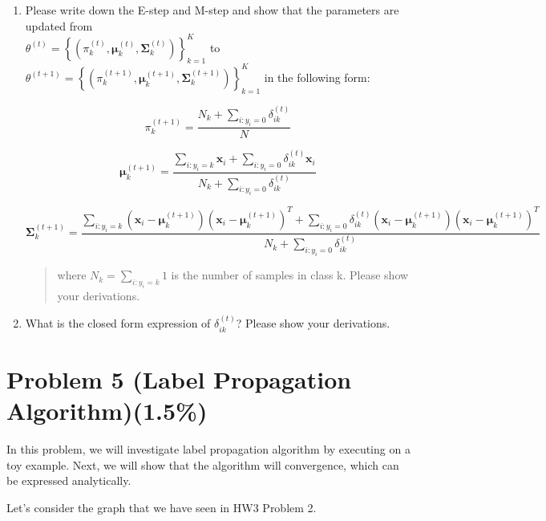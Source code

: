 \documentclass{article}
\def\vecmu{{\boldsymbol \mu}}
\begin{document}
\begin{enumerate}
\item
Please write down the E-step and M-step and show
  that the parameters are updated from \\
  \(\theta^{(t)} = \left\{ \left( \pi_{k}^{(t)},\vecmu_{k}^{(t)},\mathbf{\Sigma}_{k}^{(t)} \right) \right\}_{k = 1}^{K}\)
  to
  \(\theta^{(t + 1)} = \left\{ \left( \pi_{k}^{(t + 1)},\vecmu_{k}^{(t + 1)},\mathbf{\Sigma}_{k}^{(t + 1)} \right) \right\}_{k = 1}^{K}\)
  in the following form:


\[\pi_{k}^{(t + 1)} = \frac{N_{k} + \sum_{i:y_{i} = 0}^{}\delta_{ik}^{(t)}}{N}\]

\[\vecmu_{k}^{(t + 1)} = \frac{\sum_{i:y_{i} = k}^{}\mathbf{x}_{i} + \sum_{i:y_{i} = 0}^{}{\delta_{ik}^{(t)}\mathbf{x}_{i}}}{N_{k} + \sum_{i:y_{i} = 0}^{}\delta_{ik}^{(t)}}\]

\[\mathbf{\Sigma}_{k}^{(t + 1)} = \frac{\sum_{i:y_{i} = k}^{}{\left( \mathbf{x}_{i} - \vecmu_{k}^{(t + 1)} \right)\left( \mathbf{x}_{i} - \vecmu_{k}^{(t + 1)} \right)^{T}} + \sum_{i:y_{i} = 0}^{}{\delta_{ik}^{(t)}\left( \mathbf{x}_{i} - \vecmu_{k}^{(t + 1)} \right)\left( \mathbf{x}_{i} - \vecmu_{k}^{(t + 1)} \right)^{T}}}{N_{k} + \sum_{i:y_{i} = 0}^{}\delta_{ik}^{(t)}}\]

\begin{quote}
where \(N_{k} = \sum_{i:y_{i} = k}^{}1\) is the number of samples in
class k. Please show your derivations.
\end{quote}

\item
 What is the closed form expression of
  \(\delta_{ik}^{(t)}\)? Please show your derivations.
\end{enumerate}

\section*{Problem 5 (Label Propagation Algorithm)(1.5\%)}

In this problem, we will investigate label propagation algorithm by executing on a toy example. Next, we will show that the algorithm will convergence, which can be expressed analytically.

Let's consider the graph that we have seen in HW3 Problem 2.
\end{document}
